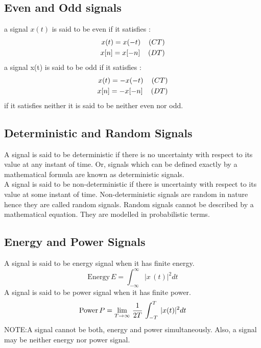 \documentclass[a4paper,12pt]{book}
\begin{document}
\subsection*{\Large{Even and Odd signals }}
	a signal $x(t)$ is said to be even if it satisfies :
	\begin{align*}
	x(t)=x(-t){\hspace{4mm}(CT)}\\
	x[n]=x[-n]{\hspace{4mm}(DT)}
	\end{align*}
	a signal x(t) is said to be odd if it satisfies :
	\begin{align*}x(t)=-x(-t){\hspace{4mm}(CT)}\\x[n]=-x[-n]{\hspace{4mm}(DT)}\end{align*}	
	if it satisfies neither it is said to be neither even nor odd.\\

\subsection*{\Large{Deterministic and Random Signals }}
A signal is said to be deterministic if there is no uncertainty with respect to its value at any instant of time. Or, signals which can be defined exactly by a mathematical formula are known as deterministic signals.\\

A signal is said to be non-deterministic if there is uncertainty with respect to its value at some instant of time. Non-deterministic signals are random in nature hence they are called random signals. Random signals cannot be described by a mathematical equation. They are modelled in probabilistic terms.\\
\subsection*{\Large{Energy and Power Signals }}
A signal is said to be energy signal when it has finite energy.
$$\text{Energy}\, E = \int_{-\infty}^{\infty} |x\,(t)|^2dt$$
A signal is said to be power signal when it has finite power.
$$\text{Power}\, P = \lim_{T \to \infty}\,{1\over2T}\,\int_{-T}^{T}\,|x(t)|^2dt$$
NOTE:A signal cannot be both, energy and power simultaneously. Also, a signal may be neither energy nor power signal.

\begingroup
\centering
\end{document}
